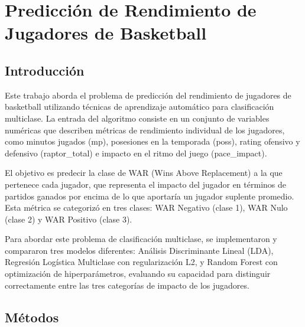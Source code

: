 \section{Predicción de Rendimiento de Jugadores de Basketball}
\begin{abstract}
En este trabajo se modeló el rendimiento de jugadores de basketball mediante clasificación multiclase. Para llevarlo a cabo, se desarrollaron e implementaron tres algoritmos desde cero: Análisis Discriminante Lineal (LDA), Regresión Logística Multiclase y Random Forest. Se probaron utilizando métricas como accuracy, precision, recall y F-score. El modelo de Random Forest performó notablemente mejor, alcanzando 95.2\% de exactitud y 0.99 de AUC-ROC en el conjunto de prueba, superando a los modelos de LDA y Regresión Logística que mostraron rendimientos similares entre sí con exactitudes de 90.5\% y 91.7\% respectivamente.
\end{abstract}

\subsection{Introducción}
Este trabajo aborda el problema de predicción del rendimiento de jugadores de basketball utilizando técnicas de aprendizaje automático para clasificación multiclase. La entrada del algoritmo consiste en un conjunto de variables numéricas que describen métricas de rendimiento individual de los jugadores, como minutos jugados (mp), posesiones en la temporada (poss), rating ofensivo y defensivo (raptor\_total) e impacto en el ritmo del juego (pace\_impact).

El objetivo es predecir la clase de WAR (Wins Above Replacement) a la que pertenece cada jugador, que representa el impacto del jugador en términos de partidos ganados por encima de lo que aportaría un jugador suplente promedio. Esta métrica se categorizó en tres clases: WAR Negativo (clase 1), WAR Nulo (clase 2) y WAR Positivo (clase 3).

Para abordar este problema de clasificación multiclase, se implementaron y compararon tres modelos diferentes: Análisis Discriminante Lineal (LDA), Regresión Logística Multiclase con regularización L2, y Random Forest con optimización de hiperparámetros, evaluando su capacidad para distinguir correctamente entre las tres categorías de impacto de los jugadores.

\subsection{Métodos}

